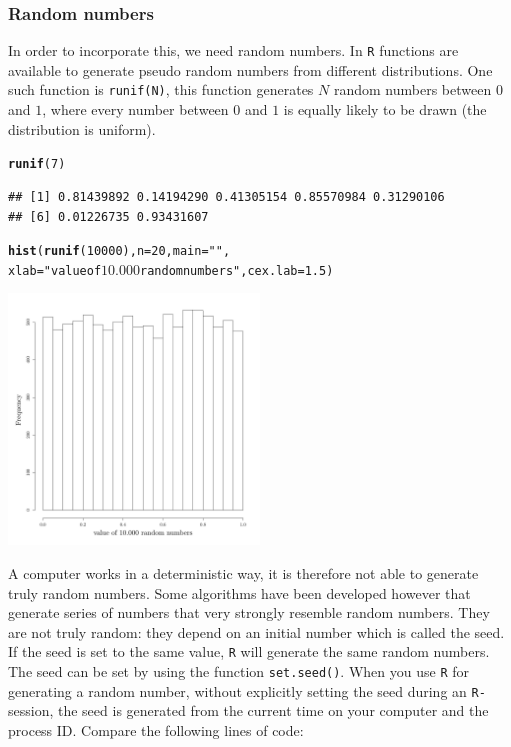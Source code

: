 \documentclass{article}\usepackage[]{graphicx}\usepackage[]{color}
\makeatletter
\newcommand{\hlnum}[1]{\textcolor[rgb]{0.686,0.059,0.569}{#1}}%
\newcommand{\hlstr}[1]{\textcolor[rgb]{0.192,0.494,0.8}{#1}}%
\newcommand{\hlstd}[1]{\textcolor[rgb]{0.345,0.345,0.345}{#1}}%
\newcommand{\hlkwc}[1]{\textcolor[rgb]{0.333,0.667,0.333}{#1}}%
\newcommand{\hlkwd}[1]{\textcolor[rgb]{0.737,0.353,0.396}{\textbf{#1}}}%
\newenvironment{kframe}{%
 \def\at@end@of@kframe{}%
 \ifinner\ifhmode%
  \def\at@end@of@kframe{\end{minipage}}%
  \begin{minipage}{\columnwidth}%
 \fi\fi%
 \def\FrameCommand##1{\hskip\@totalleftmargin \hskip-\fboxsep
 \colorbox{shadecolor}{##1}\hskip-\fboxsep
     \hskip-\linewidth \hskip-\@totalleftmargin \hskip\columnwidth}%
 \MakeFramed {\advance\hsize-\width
   \@totalleftmargin\z@ \linewidth\hsize
   \@setminipage}}%
 {\par\unskip\endMakeFramed%
 \at@end@of@kframe}
\newenvironment{knitrout}{}{} %
\makeatother
\begin{document}
\subsubsection{Random numbers}
In order to incorporate this, we need random numbers. In \texttt{R} functions are available to generate pseudo random numbers from different distributions. One such function is \texttt{runif(N)}, this function generates $N$ random numbers between $0$ and $1$, where every number between $0$ and $1$ is equally likely to be drawn (the distribution is uniform).
\begin{knitrout}
\color{fgcolor}\begin{kframe}
\begin{alltt}
\hlkwd{runif}\hlstd{(}\hlnum{7}\hlstd{)}
\end{alltt}
\begin{verbatim}
## [1] 0.81439892 0.14194290 0.41305154 0.85570984 0.31290106
## [6] 0.01226735 0.93431607
\end{verbatim}
\begin{alltt}
\hlkwd{hist}\hlstd{(}\hlkwd{runif}\hlstd{(}\hlnum{10000}\hlstd{),}\hlkwc{n}\hlstd{=}\hlnum{20}\hlstd{,}\hlkwc{main}\hlstd{=}\hlstr{""}\hlstd{,}
     \hlkwc{xlab}\hlstd{=}\hlstr{"value of $10.000$ random numbers"}\hlstd{,} \hlkwc{cex.lab}\hlstd{=}\hlnum{1.5}\hlstd{)}
\end{alltt}
\end{kframe}

{\centering \includegraphics[width=0.5\textwidth]{figure/k19-1} 

}



\end{knitrout}
A computer works in a deterministic way, it is therefore not able to generate truly random numbers. Some algorithms have been developed however that generate series of numbers that very strongly resemble random numbers. They are not truly random: they depend on an initial number which is called the seed. If the seed is set to the same value, \texttt{R} will generate the same random numbers. The seed can be set by using the function \texttt{set.seed()}. When you use \texttt{R} for generating a random number, without explicitly setting the seed during an \texttt{R-}session, the seed is generated from the current time on your computer and the process ID. Compare the following lines of code:
\end{document}
